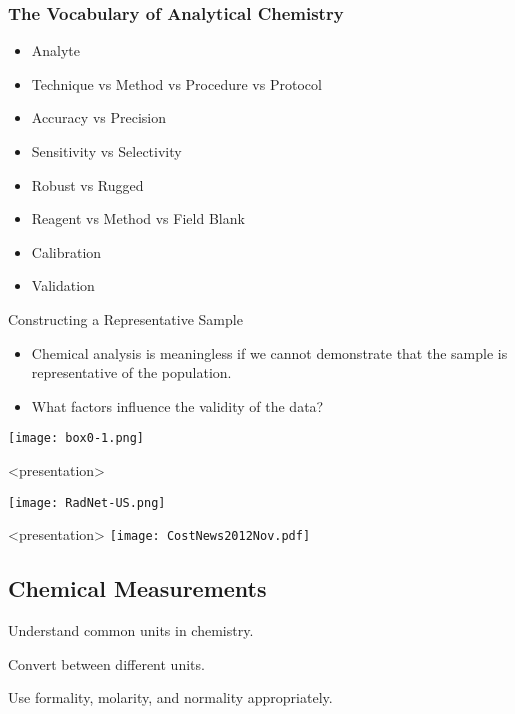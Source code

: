\documentclass[notes=show]{beamer}
\begin{document}
\begin{frame}[t]
	\frametitle{The Vocabulary of Analytical Chemistry}
	\begin{itemize}
		\item Analyte
		\item Technique vs Method vs Procedure vs Protocol
		\item Accuracy vs Precision
		\item Sensitivity vs Selectivity
		\item Robust vs Rugged
		\item Reagent vs Method vs Field Blank
		\item Calibration
		\item Validation
	\end{itemize}
\end{frame}


\begin{frame}{Constructing a Representative Sample}
	\begin{itemize}
		\item Chemical analysis is meaningless if we cannot demonstrate
			that the sample is \alert{representative} of the
			population.
		\item What factors influence the validity of the data?
	\end{itemize}

	\begin{center}
		\texttt{[image: box0-1.png]}
	\end{center}
\end{frame}

\begin{frame}<presentation>
	\begin{center}
		\texttt{[image: RadNet-US.png]}
	\end{center}
	\let\thefootnote\relax{}
\end{frame}

\begin{frame}<presentation>
	\centering
	\texttt{[image: CostNews2012Nov.pdf]}
\end{frame}


\begin{frame}
	\section{Chemical Measurements}
	\begin{learningobjectives}
		\item Understand common units in chemistry.
		\item Convert between different units.
		\item Use formality, molarity, and normality appropriately.
	\end{learningobjectives}
\end{frame}
\end{document}
